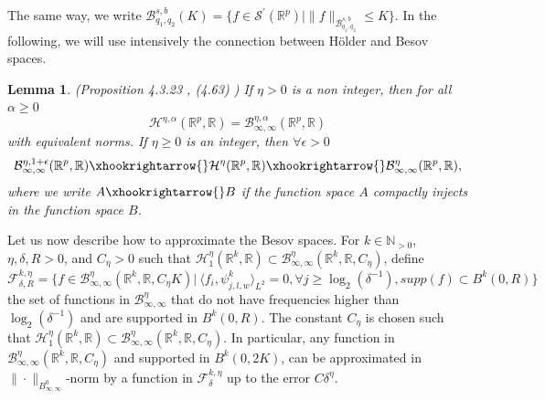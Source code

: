 \documentclass[10pt]{article}
\newtheorem{lemma}{Lemma}
\begin{document}
The same way, we write $\mathcal{B}^{s,b}_{q_1,q_2}(K)=\{f\in \mathcal{S}^{'}(\mathbb{R}^p) | \|f\|_{\mathcal{B}^{s,b}_{q_1,q_2}}\leq K\}.$
 In the following, we will use intensively the connection between Hölder and Besov spaces.
\begin{lemma}\label{lemma:inclusions} (Proposition 4.3.23 \cite{gine_nickl_2015}, (4.63)  \cite{haroske2006envelopes}) If $\eta>0$ is a non integer, then for all $\alpha\geq 0$
$$\mathcal{H}^{\eta,\alpha}(\mathbb{R}^p,\mathbb{R})=\mathcal{B}^{\eta,\alpha}_{\infty,\infty}(\mathbb{R}^p,\mathbb{R})$$
with equivalent norms. If $\eta\geq 0$ is an integer, then $\forall \epsilon>0$
$$\mathcal{B}^{\eta,1+\epsilon}_{\infty,\infty}(\mathbb{R}^p,\mathbb{R}) \xhookrightarrow{} \mathcal{H}^\eta(\mathbb{R}^p,\mathbb{R})\xhookrightarrow{} \mathcal{B}^\eta_{\infty,\infty}(\mathbb{R}^p,\mathbb{R}),$$
where we write $A\xhookrightarrow{} B$ if the function space $A$ compactly injects in the function space $B$.
\end{lemma}

Let us now describe how to approximate the Besov spaces. For $k\in \mathbb{N}_{>0}$, $\eta,\delta,R>0$, and $C_\eta>0$ such that $\mathcal{H}^\eta_1(\mathbb{R}^k,\mathbb{R})\subset \mathcal{B}^{\eta}_{\infty,\infty}(\mathbb{R}^k,\mathbb{R},C_\eta)$, define
\begin{equation}\label{eq:fdeltaper}
\mathcal{F}_{\delta,R}^{k,\eta}=\{f\in \mathcal{B}^{\eta}_{\infty,\infty}(\mathbb{R}^k,\mathbb{R},C_\eta K) | \ \langle f_i,\psi_{j,l,w}^k\rangle_{L^2}=0,  \forall j\geq \log_2(\delta^{-1}),supp(f)\subset B^k(0,R)\}
\end{equation}
the set of functions in $\mathcal{B}^{\eta}_{\infty,\infty}$ that do not have frequencies higher than $\log_2(\delta^{-1})$ and are supported in $B^k(0,R)$. The constant $C_\eta$ is chosen such that $\mathcal{H}_1^{\eta}(\mathbb{R}^k,\mathbb{R})\subset \mathcal{B}_{\infty,\infty}^{\eta}(\mathbb{R}^k,\mathbb{R},C_\eta)$. In particular, any function in $\mathcal{B}_{\infty,\infty}^{\eta}(\mathbb{R}^k,\mathbb{R},C_\eta)$ and supported in $B^k(0,2K)$, can be approximated in $\|\cdot\|_{B^{0}_{\infty,\infty}}$-norm by a function in $\mathcal{F}_\delta^{k,\eta}$ up to the error $C\delta^\eta$. 
\end{document}
